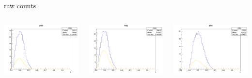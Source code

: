 \begin{frame}{raw counts}
\begin{columns}
\begin{column}[T]{0.25\textwidth}
\includegraphics[width = \textwidth]{results/yield/statistics/yield_x_Q2_z_0.50_3.979_0.40_pos.png}
\end{column}
\begin{column}[T]{0.25\textwidth}
\includegraphics[width = \textwidth]{results/yield/statistics/yield_x_Q2_z_0.50_3.979_0.40_neg.png}
\end{column}
\begin{column}[T]{0.25\textwidth}
\includegraphics[width = \textwidth]{results/yield/statistics/yield_x_Q2_z_0.50_3.979_0.50_pos.png}

\end{column}
\end{columns}
\end{frame}
